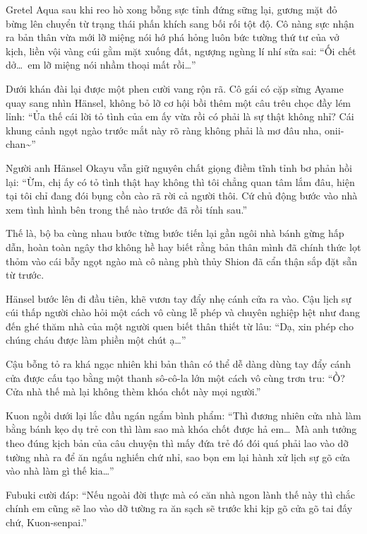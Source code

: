 \documentclass[../main.tex]{subfiles}
\begin{document}
\il

Gretel Aqua sau khi reo hò xong bỗng sực tỉnh đứng sững lại, gương mặt đỏ bừng lên chuyển từ trạng thái phấn khích sang bối rối tột độ. Cô nàng sực nhận ra bản thân vừa mới lỡ miệng nói hớ phá hỏng luôn bức tường thứ tư của vở kịch, liền vội vàng cúi gằm mặt xuống đất, ngượng ngùng lí nhí sửa sai: ``Ối chết dở\dots\ em lỡ miệng nói nhầm thoại mất rồi\dots''

\il

Dưới khán đài lại được một phen cười vang rộn rã. Cô gái có cặp sừng Ayame quay sang nhìn Hänsel, không bỏ lỡ cơ hội bồi thêm một câu trêu chọc đầy lém lỉnh: ``Ủa thế cái lời tỏ tình của em ấy vừa rồi có phải là sự thật không nhỉ? Cái khung cảnh ngọt ngào trước mắt này rõ ràng không phải là mơ đâu nha, onii-chan\~{}''

Người anh Hänsel Okayu vẫn giữ nguyên chất giọng điềm tĩnh tỉnh bơ phản hồi lại: ``Ừm, chị ấy có tỏ tình thật hay không thì tôi chẳng quan tâm lắm đâu, hiện tại tôi chỉ đang đói bụng cồn cào rã rời cả người thôi. Cứ chủ động bước vào nhà xem tình hình bên trong thế nào trước đã rồi tính sau.''

Thế là, bộ ba cùng nhau bước từng bước tiến lại gần ngôi nhà bánh gừng hấp dẫn, hoàn toàn ngây thơ không hề hay biết rằng bản thân mình đã chính thức lọt thỏm vào cái bẫy ngọt ngào mà cô nàng phù thủy Shion đã cẩn thận sắp đặt sẵn từ trước.

Hänsel bước lên đi đầu tiên, khẽ vươn tay đẩy nhẹ cánh cửa ra vào. Cậu lịch sự cúi thấp người chào hỏi một cách vô cùng lễ phép và chuyên nghiệp hệt như đang đến ghé thăm nhà của một người quen biết thân thiết từ lâu: ``Dạ, xin phép cho chúng cháu được làm phiền một chút ạ\dots''

Cậu bỗng tỏ ra khá ngạc nhiên khi bản thân có thể dễ dàng dùng tay đẩy cánh cửa được cấu tạo bằng một thanh sô-cô-la lớn một cách vô cùng trơn tru: ``Ồ? Cửa nhà thế mà lại không thèm khóa chốt này mọi người.''

\il

Kuon ngồi dưới lại lắc đầu ngán ngẩm bình phẩm: ``Thì đương nhiên cửa nhà làm bằng bánh kẹo dụ trẻ con thì làm sao mà khóa chốt được hả em\dots\ Mà anh tưởng theo đúng kịch bản của câu chuyện thì mấy đứa trẻ đó đói quá phải lao vào dỡ tường nhà ra để ăn ngấu nghiến chứ nhỉ, sao bọn em lại hành xử lịch sự gõ cửa vào nhà làm gì thế kia\dots''

Fubuki cười đáp: ``Nếu ngoài đời thực mà có căn nhà ngon lành thế này thì chắc chính em cũng sẽ lao vào dỡ tường ra ăn sạch sẽ trước khi kịp gõ cửa gõ tai đấy chứ, Kuon-senpai.''
\end{document}

